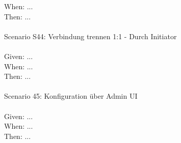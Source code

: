 \begin{tabbing}
    When:   \> \> \> ...\\
    Then:   \> \> \> ...\\
    \\
    Scenario S44: \> \> \> Verbindung trennen 1:1 - Durch Initiator \\ \\
    Given:  \> \> \> ...\\
    When:   \> \> \> ...\\
    Then:   \> \> \> ...\\
    \\
    Scenario 45: \> \> \> Konfiguration über Admin UI \\ \\
    Given:  \> \> \> ...\\
    When:   \> \> \> ...\\
    Then:   \> \> \> ...\\
    \\
\end{tabbing}
\clearpage
